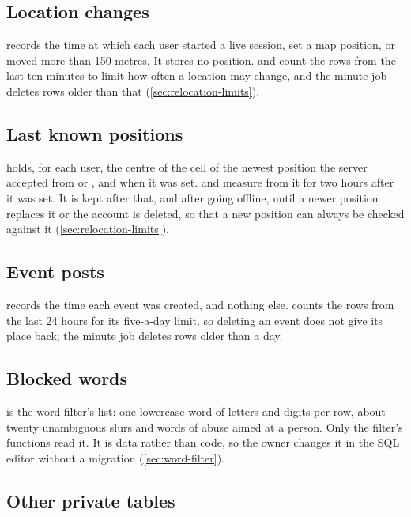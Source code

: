 \subsection{Location changes}

 records the time at which each user started a live session, set a map
position, or moved more than 150 metres. It stores no position.  and
 count the rows from the last ten minutes to limit how often a location may
change, and the minute job deletes rows older than that (\cref{sec:relocation-limits}).

\subsection{Last known positions}

 holds, for each user, the centre of the cell of the newest position the
server accepted from  or , and when it was set. 
and  measure from it for two hours after it was set. It is kept after that, and after
going offline, until a newer position replaces it or the account is deleted, so that a new position can
always be checked against it (\cref{sec:relocation-limits}).

\subsection{Event posts}

 records the time each event was created, and nothing else. 
counts the rows from the last 24 hours for its five-a-day limit, so deleting an event does not give its
place back; the minute job deletes rows older than a day.

\subsection{Blocked words}

 is the word filter's list: one lowercase word of letters and digits per row,
about twenty unambiguous slurs and words of abuse aimed at a person. Only the filter's functions read it.
It is data rather than code, so the owner changes it in the SQL editor without a migration
(\cref{sec:word-filter}).

\subsection{Other private tables}
\label{sec:private-tables}

